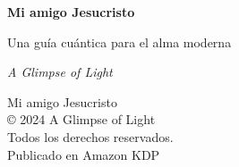 \documentclass[12pt,twoside,openany]{book}
\begin{document}
\frontmatter

\begin{titlepage}
    \centering
    \vspace*{2cm}
    {\Huge \textbf{Mi amigo Jesucristo} \par}
    \vspace{1cm}
    {\Large Una guía cuántica para el alma moderna \par}
    \vfill
    {\Large \textit{A Glimpse of Light} \par}
    \vspace*{3cm}
\end{titlepage}

\newpage
\thispagestyle{empty}
\vspace*{12cm}
\begin{center}
    \small
    Mi amigo Jesucristo \\
    © 2024 A Glimpse of Light \\
    Todos los derechos reservados. \\
    Publicado en Amazon KDP \\
\end{center}

\tableofcontents

\mainmatter


\newpage


\newpage


\newpage


\newpage


\newpage


\newpage


\newpage


\newpage


\newpage


\newpage


\newpage


\newpage


\newpage


\newpage


\newpage


\newpage


\newpage


\newpage
\end{document}
